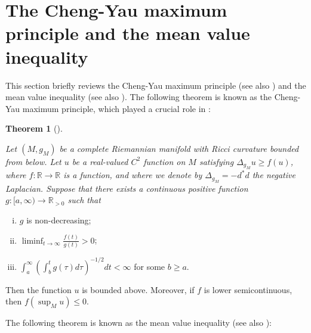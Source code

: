 \documentclass[12pt]{article}
\theoremstyle{definition}
\newtheorem{theo}[defi]{Theorem}
\def\R{{\mathbb R}}
\begin{document}
\section{The Cheng-Yau maximum principle and the mean value inequality}\label{CYMMVI}
This section briefly reviews the Cheng-Yau maximum principle \cite{CY1} (see also \cite[Section 3.1.2]{LM1}) and the mean value inequality \cite[Lemma 2.5]{CT1} (see also \cite[Section 2]{DL3}). The following theorem is known as the Cheng-Yau maximum principle, which played a crucial role in \cite{LM1}:
\begin{theo}[\cite{CY1}]\label{C-Ym}{\it Let $(M, g_M)$ be a complete Riemannian manifold with Ricci curvature bounded from below. Let $u$ be a real-valued $C^2$ function on $M$ satisfying $\Delta_{g_M} u \geq f(u)$, where $f:\R\rightarrow \R$ is a function, and where we denote by $\Delta_{g_M} = -d^\ast d$ the negative Laplacian. Suppose that there exists a continuous positive function $g:[a,\infty)\rightarrow \R_{>0}$ such that
\begin{enumerate}[(i)]
\item $g$ is non-decreasing;
\item $\liminf_{t\to\infty}\frac{f(t)}{g(t)}>0$;
\item $\int_a^\infty(\int_b^tg(\tau)d\tau)^{-1/2}dt<\infty$ for some $b\geq a$.
\end{enumerate}
Then the function $u$ is bounded above. Moreover, if $f$ is lower semicontinuous, then $f(\sup_M u)\leq 0$.
}
\end{theo}
The following theorem is known as the mean value inequality (see also \cite[Section 2]{DL3}):
\end{document}
